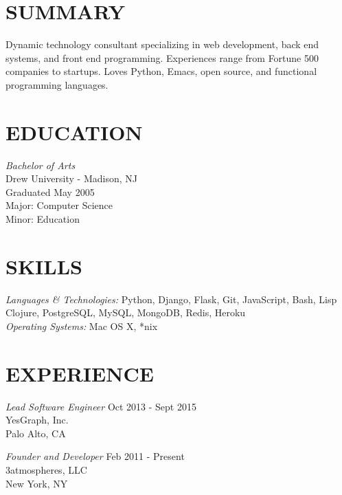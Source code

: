 \documentclass[line,margin]{res}
\begin{document}
\address{22 Michael Way, Pennington, NJ 08534}
\address{347.503.9000}


\begin{resume}

  \section{SUMMARY}       Dynamic technology consultant specializing in web
                development, back end systems, and front end programming.
                Experiences range from Fortune 500 companies to startups.
                Loves Python, Emacs, open source, and functional programming languages.


\section{EDUCATION} {\sl Bachelor of Arts} \\
                Drew University - Madison, NJ \\
                Graduated May 2005 \\
                Major: Computer Science \\
                Minor: Education


                \section{SKILLS} {\sl Languages \& Technologies:} Python, Django, Flask, Git,
                JavaScript, Bash, Lisp \\
                Clojure, PostgreSQL, MySQL, MongoDB, Redis, Heroku \\
                {\sl Operating Systems:} Mac OS X, *nix


\section{EXPERIENCE} {\sl Lead Software Engineer} \hfill      Oct 2013 - Sept 2015 \\
                YesGraph, Inc. \\
                Palo Alto, CA

                {\sl Founder and Developer} \hfill            Feb 2011 - Present \\
                3atmospheres, LLC \\
                New York, NY


\end{resume}
\end{document}
